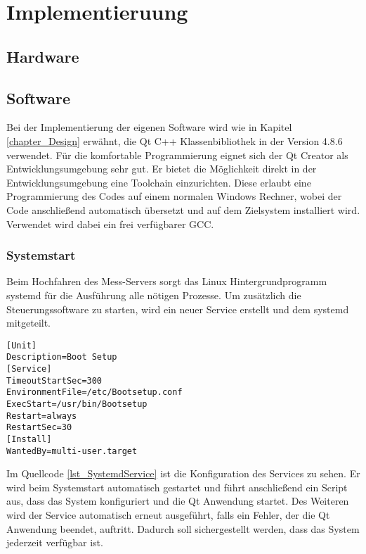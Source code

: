 \chapter{Implementieruung}
\label{chapter_Implementierung}

\section{Hardware}

\section{Software}


Bei der Implementierung der eigenen Software wird wie in Kapitel \ref{chapter_Design} erwähnt, die Qt C++ Klassenbibliothek in der Version 4.8.6 verwendet. Für die komfortable Programmierung eignet sich der Qt Creator als Entwicklungsumgebung sehr gut. Er bietet die Möglichkeit direkt in der Entwicklungsumgebung eine Toolchain einzurichten. Diese erlaubt eine Programmierung des Codes auf einem normalen Windows Rechner, wobei der Code anschließend automatisch übersetzt und auf dem Zielsystem installiert wird. Verwendet wird dabei ein frei verfügbarer \ac{GCC}.\\



\subsection{Systemstart}

Beim Hochfahren des Mess-Servers sorgt das Linux Hintergrundprogramm systemd für die Ausführung alle nötigen Prozesse. Um zusätzlich die Steuerungssoftware zu starten, wird ein neuer Service erstellt und dem systemd mitgeteilt.\\

\begin{lstlisting}[caption={Systemd Service},label=lst_SystemdService]
[Unit]
Description=Boot Setup
[Service]
TimeoutStartSec=300
EnvironmentFile=/etc/Bootsetup.conf
ExecStart=/usr/bin/Bootsetup
Restart=always
RestartSec=30
[Install]
WantedBy=multi-user.target
\end{lstlisting}

Im Quellcode \ref{lst_SystemdService} ist die Konfiguration des Services zu sehen. Er wird beim Systemstart automatisch gestartet und führt anschließend ein Script aus, dass das System konfiguriert und die Qt Anwendung startet. Des Weiteren wird der Service automatisch erneut ausgeführt, falls ein Fehler, der die Qt Anwendung beendet, auftritt. Dadurch soll sichergestellt werden, dass das System jederzeit verfügbar ist.\\

